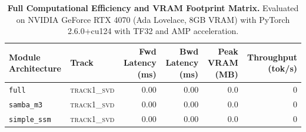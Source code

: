 \begin{table}[t]
\centering
\small
\caption{\textbf{Full Computational Efficiency and VRAM Footprint Matrix.} Evaluated on NVIDIA GeForce RTX 4070 (Ada Lovelace, 8GB VRAM) with PyTorch 2.6.0+cu124 with TF32 and AMP acceleration.}
\label{tab:efficiency_benchmark_results}
\begin{tabular}{l l r r r r}
\toprule
\textbf{Module Architecture} & \textbf{Track} & \textbf{Fwd Latency (ms)} & \textbf{Bwd Latency (ms)} & \textbf{Peak VRAM (MB)} & \textbf{Throughput (tok/s)} \\
\midrule
\texttt{full} & \textsc{track1\_svd} & 0.00 & 0.00 & 0.0 & 0 \\
\texttt{samba\_m3} & \textsc{track1\_svd} & 0.00 & 0.00 & 0.0 & 0 \\
\texttt{simple\_ssm} & \textsc{track1\_svd} & 0.00 & 0.00 & 0.0 & 0 \\
\bottomrule
\end{tabular}
\end{table}